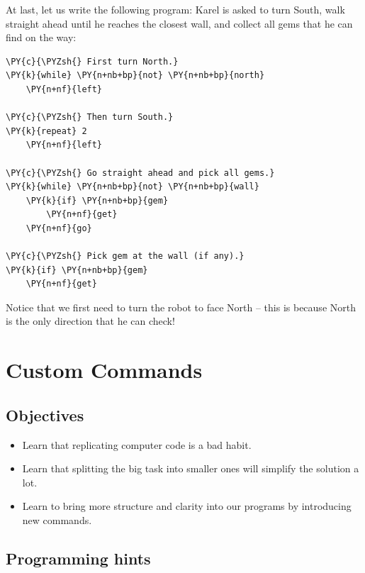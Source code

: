 \noindent
At last, let us write the following program: Karel is asked to 
turn South, walk straight ahead until he reaches the closest wall, and 
collect all gems that he can find on the way:

\begin{bbox}
\begin{Verbatim}[commandchars=\\\{\}]
\PY{c}{\PYZsh{} First turn North.}
\PY{k}{while} \PY{n+nb+bp}{not} \PY{n+nb+bp}{north}
    \PY{n+nf}{left}

\PY{c}{\PYZsh{} Then turn South.}
\PY{k}{repeat} 2
    \PY{n+nf}{left}

\PY{c}{\PYZsh{} Go straight ahead and pick all gems.}
\PY{k}{while} \PY{n+nb+bp}{not} \PY{n+nb+bp}{wall}
    \PY{k}{if} \PY{n+nb+bp}{gem}
        \PY{n+nf}{get}
    \PY{n+nf}{go}

\PY{c}{\PYZsh{} Pick gem at the wall (if any).}
\PY{k}{if} \PY{n+nb+bp}{gem}
    \PY{n+nf}{get}
\end{Verbatim}
\end{bbox}
\vspace{6mm}

\noindent
Notice that we first need to turn the robot to face North -- this is because North 
is the only direction that he can check!



\section{Custom Commands} \label{sec:newcom}

\subsection{Objectives} 
 
\begin{itemize}
\item Learn that replicating computer code is a bad habit.
\item Learn that splitting the big task into smaller ones will simplify the solution a lot. 
\item Learn to bring more structure and clarity into our programs by introducing new commands.
\end{itemize}

\subsection{Programming hints}

